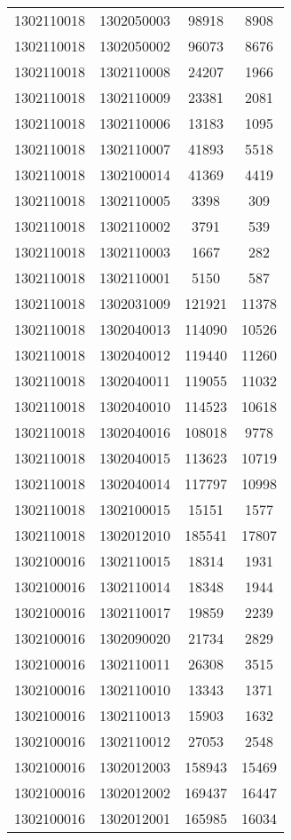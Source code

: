 \begin{longtable}{llcc}
1302110018 & 1302050003 & 98918 & 8908\\
1302110018 & 1302050002 & 96073 & 8676\\
1302110018 & 1302110008 & 24207 & 1966\\
1302110018 & 1302110009 & 23381 & 2081\\
1302110018 & 1302110006 & 13183 & 1095\\
1302110018 & 1302110007 & 41893 & 5518\\
1302110018 & 1302100014 & 41369 & 4419\\
1302110018 & 1302110005 & 3398 & 309\\
1302110018 & 1302110002 & 3791 & 539\\
1302110018 & 1302110003 & 1667 & 282\\
1302110018 & 1302110001 & 5150 & 587\\
1302110018 & 1302031009 & 121921 & 11378\\
1302110018 & 1302040013 & 114090 & 10526\\
1302110018 & 1302040012 & 119440 & 11260\\
1302110018 & 1302040011 & 119055 & 11032\\
1302110018 & 1302040010 & 114523 & 10618\\
1302110018 & 1302040016 & 108018 & 9778\\
1302110018 & 1302040015 & 113623 & 10719\\
1302110018 & 1302040014 & 117797 & 10998\\
1302110018 & 1302100015 & 15151 & 1577\\
1302110018 & 1302012010 & 185541 & 17807\\
1302100016 & 1302110015 & 18314 & 1931\\
1302100016 & 1302110014 & 18348 & 1944\\
1302100016 & 1302110017 & 19859 & 2239\\
1302100016 & 1302090020 & 21734 & 2829\\
1302100016 & 1302110011 & 26308 & 3515\\
1302100016 & 1302110010 & 13343 & 1371\\
1302100016 & 1302110013 & 15903 & 1632\\
1302100016 & 1302110012 & 27053 & 2548\\
1302100016 & 1302012003 & 158943 & 15469\\
1302100016 & 1302012002 & 169437 & 16447\\
1302100016 & 1302012001 & 165985 & 16034\\

\end{longtable}
